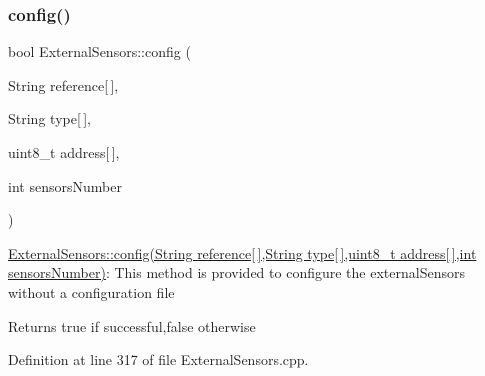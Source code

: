 \subsubsection{\texorpdfstring{config()}{config()}\hspace{0.1cm}{\footnotesize\ttfamily [2/2]}}
{\footnotesize\ttfamily bool External\+Sensors\+::config (\begin{DoxyParamCaption}\item[{String}]{reference\mbox{[}$\,$\mbox{]},  }\item[{String}]{type\mbox{[}$\,$\mbox{]},  }\item[{uint8\+\_\+t}]{address\mbox{[}$\,$\mbox{]},  }\item[{int}]{sensors\+Number }\end{DoxyParamCaption})}

\hyperlink{class_external_sensors_ac829858f587e15a3fcb00567248f0edd}{External\+Sensors\+::config(\+String reference\mbox{[}$\,$\mbox{]},\+String type\mbox{[}$\,$\mbox{]},uint8\+\_\+t address\mbox{[}$\,$\mbox{]},int sensors\+Number)}\+: This method is provided to configure the external\+Sensors without a configuration file

\begin{DoxyReturn}{Returns}
true if successful,false otherwise 
\end{DoxyReturn}


Definition at line 317 of file External\+Sensors.\+cpp.


